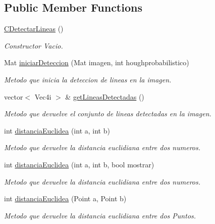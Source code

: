 \subsection*{Public Member Functions}
\begin{DoxyCompactItemize}
\item 
\hyperlink{classCDetectarLineas_a4a48d20f23a63a2a0202a316317e0801}{C\+Detectar\+Lineas} ()
\begin{DoxyCompactList}\small\item\em Constructor Vacio. \end{DoxyCompactList}\item 
Mat \hyperlink{classCDetectarLineas_a8380e777f5cac60aae54ac0cf13b7246}{iniciar\+Deteccion} (Mat imagen, int houghprobabilistico)
\begin{DoxyCompactList}\small\item\em Metodo que inicia la deteccion de lineas en la imagen. \end{DoxyCompactList}\item 
vector$<$ Vec4i $>$ \& \hyperlink{classCDetectarLineas_ad98f9627f640966b7e11af7d10a4b9e8}{get\+Lineas\+Detectadas} ()
\begin{DoxyCompactList}\small\item\em Metodo que devuelve el conjunto de lineas detectadas en la imagen. \end{DoxyCompactList}\item 
int \hyperlink{classCDetectarLineas_ad7493ac0d73201a7c9188f8a283b6a88}{distancia\+Euclidea} (int a, int b)
\begin{DoxyCompactList}\small\item\em Metodo que devuelve la distancia euclidiana entre dos numeros. \end{DoxyCompactList}\item 
int \hyperlink{classCDetectarLineas_abe5bf1860071f33e7339742fd88e6e78}{distancia\+Euclidea} (int a, int b, bool mostrar)
\begin{DoxyCompactList}\small\item\em Metodo que devuelve la distancia euclidiana entre dos numeros. \end{DoxyCompactList}\item 
int \hyperlink{classCDetectarLineas_a88fe565263283487188f7c032a661d2f}{distancia\+Euclidea} (Point a, Point b)
\begin{DoxyCompactList}\small\item\em Metodo que devuelve la distancia euclidiana entre dos Puntos. \end{DoxyCompactList}\end{DoxyCompactItemize}
